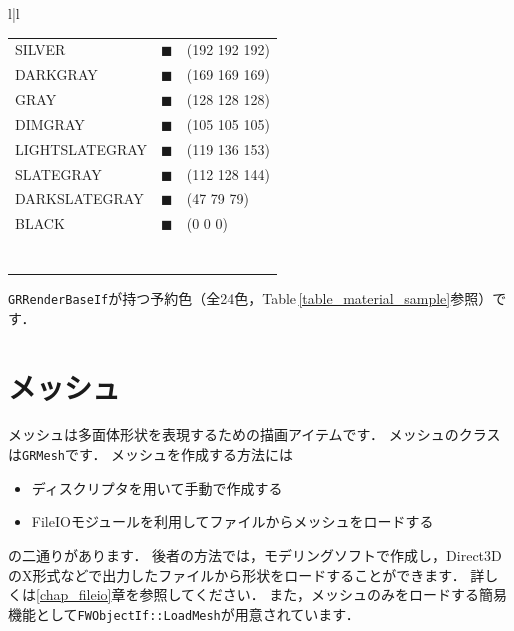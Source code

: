 \begin{table}[t]
{\begin{center}
\begin{tabular}{l|l}
\begin{tabular}{lll}
SILVER				& {\color[RGB]{192,192,192}$\blacksquare$}	& (192 192 192)	\\
DARKGRAY			& {\color[RGB]{169,169,169}$\blacksquare$}	& (169 169 169)	\\
GRAY				& {\color[RGB]{128,128,128}$\blacksquare$}	& (128 128 128)	\\
DIMGRAY				& {\color[RGB]{105,105,105}$\blacksquare$}	& (105 105 105)	\\
LIGHTSLATEGRAY		& {\color[RGB]{119,136,153}$\blacksquare$}	& (119 136 153)	\\
SLATEGRAY			& {\color[RGB]{112,128,144}$\blacksquare$}	& (112 128 144)	\\
DARKSLATEGRAY		& {\color[RGB]{47,79,79}$\blacksquare$}	& (47 79 79)	\\
BLACK				& {\color[RGB]{0,0,0}$\blacksquare$}	& (0 0 0)	\\
\\
\\
\\
\\
\\
\\
\\
\end{tabular}
\ifLwarp\else
\end{tabular}
\fi
\end{center}
}
\end{table}

\texttt{GRRenderBaseIf}\KLUDGE が持つ予約色（全24\KLUDGE 色，Table\,\ref{table_material_sample}\KLUDGE 参照）です．

\section{\KLUDGE メッシュ}

\KLUDGE メッシュは多面体形状を表現するための描画アイテムです．
\KLUDGE メッシュのクラスは\texttt{GRMesh}\KLUDGE です．
\KLUDGE メッシュを作成する方法には
\begin{itemize}
\item \KLUDGE ディスクリプタを用いて手動で作成する
\item FileIO\KLUDGE モジュールを利用してファイルからメッシュをロードする
\end{itemize}
\KLUDGE の二通りがあります．
\KLUDGE 後者の方法では，モデリングソフトで作成し，Direct3D\KLUDGE のX\KLUDGE 形式などで出力したファイルから形状をロードすることができます．
\KLUDGE 詳しくは\ref{chap_fileio}\KLUDGE 章を参照してください．
\KLUDGE また，メッシュのみをロードする簡易機能として\texttt{FWObjectIf::LoadMesh}\KLUDGE が用意されています．

